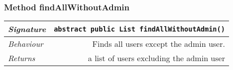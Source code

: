 \begin{adjustwidth}{1.5em}{0pt}
\begin{adjustwidth}{1.5em}{0pt}
\begin{adjustwidth}{1.5em}{0pt}
{\begin{tabularx}{1.0\linewidth}{@{}l R@{}}
      \end{tabularx}}
    \end{adjustwidth}\subsubsection{Method findAllWithoutAdmin\label{edu.kit.hci.soli.repository.UserRepository@findAllWithoutAdmin()}}
    \begin{adjustwidth}{1.5em}{0pt}
      {\begin{tabularx}{1.0\linewidth}{@{}l R@{}}
        \emph{Signature} & \texttt{abstract public \texttt{List} findAllWithoutAdmin()} \\
        \hline
        \emph{Behaviour} & Finds all users except the admin user.    \\
        \hline
        \emph{Returns} & a list of users excluding the admin user  \\
        \hline
  
      \end{tabularx}}
    \end{adjustwidth}
  \end{adjustwidth}
\end{adjustwidth}